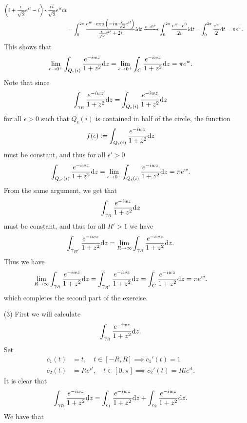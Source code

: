 \documentclass[11pt,a4paper]{article}
\begin{document}
\begin{solution}
\begin{enumerate}
\begin{align*}
{       \del{i + \frac{\epsilon}{\sqrt 2} e^{i t} - i}} \cdot
      \frac{\epsilon i}{\sqrt 2} e^{i t} \dt \\ &=
      \int_{0}^{2 \pi}
      \frac{e^{w} \cdot \exp\del{- i w \frac{\epsilon}{\sqrt 2} e^{i t}}}
      {\frac{\epsilon}{\sqrt 2} e^{i t} + 2 i} i \dt \taking{e \to 0^+}
      \int_{0}^{2 \pi} \frac{e^{w} \cdot e^{0}}{2 i} i \dt =
      \int_{0}^{2 \pi} \frac{e^{w}}{2} \dt = \pi e^{w}.
    \end{align*}
    This shows that
    \[
      \lim_{\epsilon \to 0^+} 
      \int_{Q_{\epsilon}(i)} \frac{e^{-i w z}}{1 + z^2} \dz =
      \lim_{\epsilon \to 0^+} 
      \int_{C} \frac{e^{-i w z}}{1 + z^2} \dz = \pi e^{w}.
    \]
    Note that since
    \[
      \int_{\gamma_R} \frac{e^{-i w z}}{1 + z^2} \dz =
      \int_{Q_{\epsilon}(i)} \frac{e^{-i w z}}{1 + z^2} \dz
    \]
    for all $\epsilon > 0$ such that $Q_{\epsilon}(i)$ is contained
    in half of the circle, the function
    \[
      f(\epsilon) := \int_{Q_{\epsilon}(i)} \frac{e^{-i w z}}{1 + z^2} \dz
    \]
    must be constant, and thus for all $\epsilon' > 0$
    \[
      \int_{Q_{\epsilon'}(i)} \frac{e^{-i w z}}{1 + z^2} \dz =
      \lim_{\epsilon \to 0^+} 
      \int_{Q_{\epsilon}(i)} \frac{e^{-i w z}}{1 + z^2} \dz = \pi e^{w}.
    \]
    From the same argument, we get that
    \[
      \int_{\gamma_R} \frac{e^{-i w z}}{1 + z^2} \dz
    \]
    must be constant, and thus for all $R' > 1$ we have
    \[
      \int_{\gamma_{R'}} \frac{e^{-i w z}}{1 + z^2} \dz =
      \lim_{R \to \infty}
      \int_{\gamma_{R}} \frac{e^{-i w z}}{1 + z^2} \dz.
    \]
    Thus we have
    \[
      \lim_{R \to \infty}
      \int_{\gamma_{R}} \frac{e^{-i w z}}{1 + z^2} \dz =
      \int_{\gamma_{R'}} \frac{e^{-i w z}}{1 + z^2} \dz =
      \int_{C} \frac{e^{-i w z}}{1 + z^2} \dz = \pi e^{w}.
    \]
    which completes the second part of the exercise.
  \item[(3)] First we will calculate
    \[
      \int_{\gamma_{R}} \frac{e^{-i w z}}{1 + z^2} \mathrm{d} z.
    \]
    Set
    \begin{align*}
      c_1(t) &= t, \quad t \in [-R,R] \implies c_1'(t) = 1\\
      c_2(t) &= Re^{i t}, \quad t \in [0,\pi] \implies c_2'(t) = R i e^{i t}.
    \end{align*}
    It is clear that
    \[
      \int_{\gamma_{R}} \frac{e^{-i w z}}{1 + z^2} \mathrm{d} z =
      \int_{c_1} \frac{e^{-i w z}}{1 + z^2} \mathrm{d} z +
      \int_{c_2} \frac{e^{-i w z}}{1 + z^2} \mathrm{d} z.
    \]
    We have that
    \begin{align*}

\end{align*}
\end{enumerate}
\end{solution}
\end{document}
